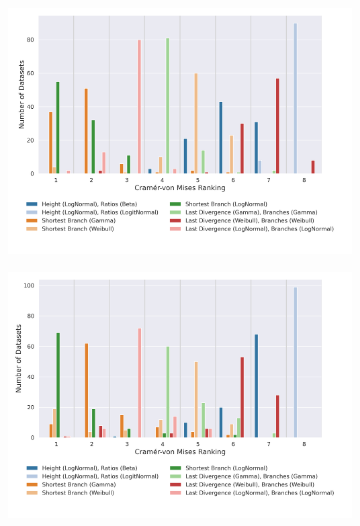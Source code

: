 \documentclass[10pt,letterpaper]{article}
\begin{document}
\begin{figure}
	\caption{How often a specific method ranks at a certain position when its Cramér-von Mises criterion is compared to the other methods. For example, the height ratio embedding with the beta distribution ranked first for almost all datasets. (The lower the rank the better.)}
	
	\centering
	\begin{subfigure}[b]{0.4\textwidth}
		\centering
		\includegraphics[width=\textwidth]{figures/yule-100-ccd1-cvm-ranking.png}
	\end{subfigure}
	\begin{subfigure}[b]{0.4\textwidth}
		\centering
		\includegraphics[width=\textwidth]{figures/yule-200-ccd1-cvm-ranking.png}
	\end{subfigure}
	

\end{figure}
\end{document}
